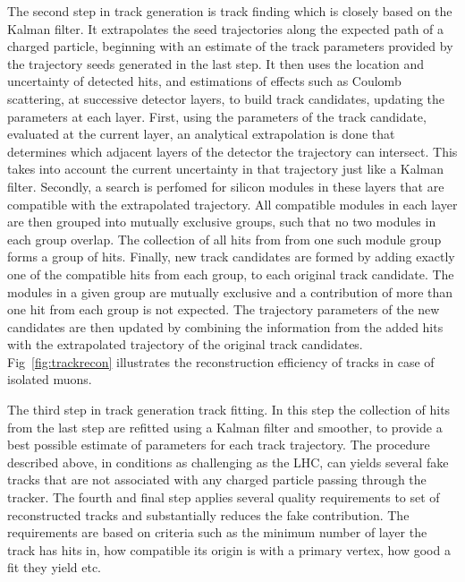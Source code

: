 The second step in track generation is track finding which is closely based on the Kalman filter. It extrapolates the seed trajectories along the expected path of a charged particle, beginning with an estimate of the track parameters provided by the trajectory seeds generated in the last step. It then uses the location and uncertainty of detected hits, and estimations of effects such as Coulomb scattering, at successive detector layers, to build track candidates, updating the parameters at each layer. First, using the parameters of the track candidate, evaluated at the current layer, an analytical extrapolation is done that determines which adjacent layers of the detector the trajectory can intersect. This takes into account the current uncertainty in that trajectory just like a Kalman filter. Secondly, a search is perfomed for silicon modules in these layers that are compatible with the extrapolated trajectory. All compatible modules in each layer are then grouped into mutually exclusive groups, such that no two modules in each group overlap. The collection of all hits from from one such module group forms a group of hits. Finally, new track candidates are formed by adding exactly one of the compatible hits from each group, to each original track candidate. The modules in a given group are mutually exclusive and a contribution of more than one hit from each group is not expected. The trajectory parameters of the new candidates are then updated by combining the information from the added hits with the extrapolated trajectory of the original track candidates. Fig~\ref{fig:trackrecon} illustrates the reconstruction efficiency of tracks in case of isolated muons.

The third step in track generation track fitting. In this step the collection of hits from the last step are refitted using a Kalman filter and smoother, to provide a best possible estimate of parameters for each track trajectory. The procedure described above, in conditions as challenging as the LHC, can yields several fake tracks that are not associated with any charged particle passing through the tracker. The fourth and final step applies several quality requirements to set of reconstructed tracks and substantially reduces the fake contribution. The requirements are based on criteria such as the minimum number of layer the track has hits in, how compatible its origin is with a primary vertex, how good a fit they yield etc.


